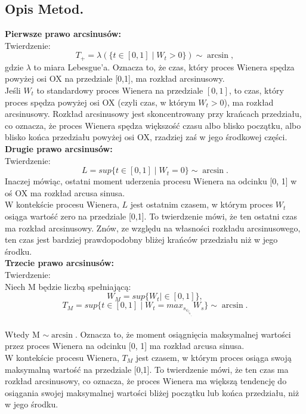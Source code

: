 \documentclass[12pt,letterpaper]{article}
\theoremstyle{definition}
\begin{document}
\subsection{Opis Metod.}
\textbf{Pierwsze prawo arcsinusów:}\\

Twierdzenie:\\
$$T_+= \lambda ( \{t\in [0,1] \mid W_t>0 \})\sim \arcsin,$$
gdzie $\lambda$ to miara Lebesgue’a. Oznacza to, że czas, który proces Wienera spędza powyżej osi OX na przedziale 
[0,1], ma rozkład arcsinusowy.\\

Jeśli $W_t$ to standardowy proces Wienera na przedziale $[0,1]$, to czas, który proces spędza powyżej osi OX (czyli czas, w którym $W_t>0$), ma rozkład arcsinusowy. Rozkład arcsinusowy jest skoncentrowany przy krańcach przedziału, co oznacza, że proces Wienera spędza większość czasu albo blisko początku, albo blisko końca przedziału powyżej osi OX, rzadziej zaś w jego środkowej części.\\


\textbf{Drugie prawo arcsinusów:}\\


Twierdzenie:\\
$$L = sup\{t \in [0, 1]\mid W_t = 0\} \sim \arcsin.$$ Inaczej mówiąc, ostatni moment uderzenia procesu Wienera na odcinku [0, 1] w oś OX ma rozkład arcusa sinusa.\\

W kontekście procesu Wienera, $L$ jest ostatnim czasem, w którym proces $W_t$ osiąga wartość zero na przedziale [0,1]. To twierdzenie mówi, że ten ostatni czas ma rozkład arcsinusowy. Znów, ze względu na własności rozkładu arcsinusowego, ten czas jest bardziej prawdopodobny bliżej krańców przedziału niż w jego środku.\\

\textbf{Trzecie prawo arcsinusów:}\\

Twierdzenie:\\

Niech M będzie liczbą spełniającą:
$$W_M = sup\{W_t\mid \in [0, 1]\}, $$
$$T_M = sup\{t \in [0,1] \mid W_t = max_s_\in_[_0_,_1_] W_s\}\sim \arcsin .$$\\
Wtedy M $\sim \arcsin$. Oznacza to, że moment osiągnięcia maksymalnej wartości przez proces Wienera na odcinku [0, 1] ma rozkład arcusa sinusa.\\

W kontekście procesu Wienera, $T_M$ jest czasem, w którym proces osiąga swoją maksymalną wartość na przedziale [0,1]. To twierdzenie mówi, że ten czas ma rozkład arcsinusowy, co oznacza, że proces Wienera ma większą tendencję do osiągania swojej maksymalnej wartości bliżej początku lub końca przedziału, niż w jego środku.\\
\end{document}

